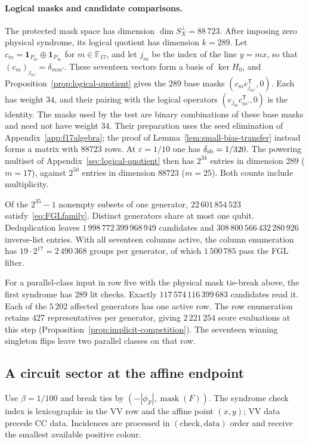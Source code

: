 \documentclass[10pt,twocolumn]{article}
\theoremstyle{definition}
\begin{document}
\paragraph{Logical masks and candidate comparisons.}
The protected mask space has dimension $\dim S_X^\perp=88\,723$.
After imposing zero physical syndrome, its logical quotient has
dimension $k=289$. Let
$c_m=\mathbf 1_{P_m}\oplus\mathbf 1_{P_\infty}$ for $m\in\mathbb F_{17}$,
and let $j_m$ be the index of the line $y=mx$, so that
$(c_m)_{j_{m'}}=\delta_{mm'}$. These seventeen vectors form a basis of
$\ker H_0$, and Proposition~\ref{prop:logical-quotient} gives the $289$
base masks $(c_me_{j_{m'}}^{\mathsf T},0)$. Each has weight $34$, and
their pairing with the logical operators
$(e_{j_m}c_{m'}^{\mathsf T},0)$ is the identity. The masks used by the
test are binary combinations of these base masks and need not have
weight $34$. Their preparation uses the seed elimination of
Appendix~\ref{app:f17algebra}; the proof of
Lemma~\ref{lem:small-bias-transfer} instead forms a matrix with $88723$
rows. At $\varepsilon=1/10$ one has $\delta_{\rm sb}=1/320$. The
powering multiset of Appendix~\ref{sec:logical-quotient} then has
$2^{34}$ entries in dimension $289$ ($m=17$), against $2^{50}$ entries
in dimension $88723$ ($m=25$). Both counts include multiplicity.

Of the $2^{35}-1$ nonempty subsets of one generator,
$22\,601\,854\,523$ satisfy~\eqref{eq:FGLfamily}. Distinct generators
share at most one qubit. Deduplication leaves
$1\,998\,772\,399\,968\,949$ candidates and
$308\,800\,566\,432\,280\,926$ inverse-list entries. With all seventeen
columns active, the column enumeration has $19\cdot2^{17}=2\,490\,368$
groups per generator, of which $1\,500\,785$ pass the FGL filter.

For a parallel-class input in row five with the physical mask
tie-break above, the first syndrome has $289$ lit checks.
Exactly $117\,574\,116\,399\,683$ candidates read it. Each of the
$5\,202$ affected generators has one active row. The row enumeration
retains $427$ representatives per generator, giving $2\,221\,254$ score
evaluations at this step (Proposition~\ref{prop:implicit-competition}).
The seventeen winning singleton flips leave two parallel classes on
that row.

\subsection{A circuit sector at the affine endpoint}\label{app:finite-sector}
Use $\beta=1/100$ and break ties by $(-|\phi_F|,\operatorname{mask}(F))$. The syndrome
check index is lexicographic in the VV row and the affine point $(x,y)$;
VV data precede CC data. Incidences are processed in $(\text{check},\text{data})$
order and receive the smallest available positive colour.
\end{document}
